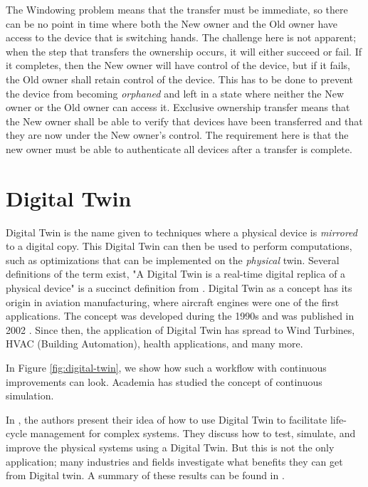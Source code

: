 The Windowing problem means that the transfer must be immediate, so there can be no point in time where both the New owner and the Old owner have access to the device that is switching hands. The challenge here is not apparent; when the step that transfers the ownership occurs, it will either succeed or fail. If it completes, then the New owner will have control of the device, but if it fails, the Old owner shall retain control of the device. This has to be done to prevent the device from becoming \emph{orphaned} and left in a state where neither the New owner or the Old owner can access it. 
Exclusive ownership transfer means that the New owner shall be able to verify that devices have been transferred and that they are now under the New owner's control. The requirement here is that the new owner must be able to authenticate all devices after a transfer is complete.



\section{Digital Twin}
\label{sec:digital_twin}
 Digital Twin is the name given to techniques where a physical device is \emph{mirrored} to a digital copy. This Digital Twin can then be used to perform computations, such as optimizations that can be implemented on the \emph{physical} twin. Several definitions of the term exist, "A Digital Twin is a real-time digital replica of a physical device" is a succinct definition from \cite{bacchiega2019}. Digital Twin as a concept has its origin in aviation manufacturing, where aircraft engines were one of the first applications. The concept was developed during the 1990s and was published in 2002 \cite{grieves2019virtually}. Since then, the application of Digital Twin has spread to Wind Turbines, HVAC (Building Automation), health applications, and many more. 

In Figure \ref{fig:digital-twin}, we show how such a workflow with continuous improvements can look. Academia \cite{boschert2016digital} has studied the concept of continuous simulation.

In \cite{grieves2014digital}\cite{grieves2017digital}, the authors present their idea of how to use Digital Twin to facilitate life-cycle management for complex systems. They discuss how to test, simulate, and improve the physical systems using a Digital Twin. But this is not the only application; many industries and fields investigate what benefits they can get from Digital twin. A summary of these results can be found in \cite{8424832}. 

